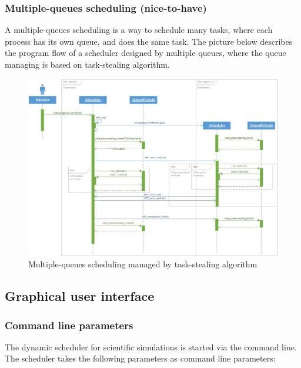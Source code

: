 \subsubsection{Multiple-queues scheduling (nice-to-have)}	
\vspace{0.5cm}
A multiple-queues scheduling is a way to schedule many tasks, where each process has its own queue, and does the same task. The picture below describes the program flow of a scheduler designed by multiple queues, where the queue managing is based on task-stealing algorithm.
\vspace{1cm}
	\begin{figure}[H]
	\centering
	\includegraphics[width=15cm]{images/Task-stealing.jpg}
	\caption{Multiple-queues scheduling managed by task-stealing algorithm}
	\end{figure}
\newpage
	
\subsection{Graphical user interface}
	\subsubsection{Command line parameters}
		The dynamic scheduler for scientific simulations is started via the command line. The scheduler takes the following parameters as command line parameters:
	
